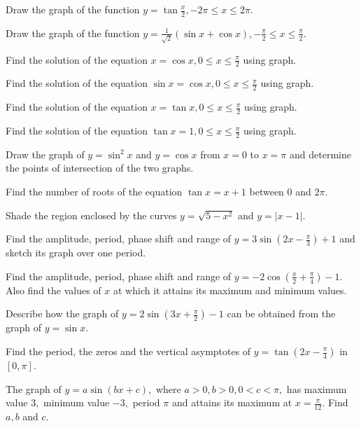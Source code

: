 \item Draw the graph of the function $y = \tan\frac{x}{2}, -2\pi\leq x\leq 2\pi$.

\item Draw the graph of the function $y = \frac{1}{\sqrt{2}}(\sin x + \cos x), -\frac{\pi}{2}\leq
    x\leq\frac{\pi}{2}$.

\item Find the solution of the equation $x = \cos x, 0\leq x\leq\frac{\pi}{2}$ using graph.

\item Find the solution of the equation $\sin x = \cos x, 0\leq x\leq\frac{\pi}{2}$ using graph.

\item Find the solution of the equation $x = \tan x, 0\leq x\leq\frac{\pi}{2}$ using graph.

\item Find the solution of the equation $\tan x = 1, 0\leq x\leq \frac{\pi}{2}$ using graph.

\item Draw the graph of $y = \sin^2x$ and $y = \cos x$ from $x = 0$ to $x = \pi$ and
    determine the points of intersection of the two graphs.

\item Find the number of roots of the equation $\tan x = x + 1$ between $0$ and $2\pi$.

\item Shade the region enclosed by the curves $y = \sqrt{5 - x^2}$ and $y = |x - 1|$.

\item Find the amplitude, period, phase shift and range of $y = 3\sin\left(2x - \frac{\pi}{3}\right) + 1$ and
    sketch its graph over one period.

\item Find the amplitude, period, phase shift and range of $y = -2\cos\left(\frac{x}{2} + \frac{\pi}{4}\right) - 1.$
    Also find the values of $x$ at which it attains its maximum and minimum values.

\item Describe how the graph of $y = 2\sin\left(3x + \frac{\pi}{2}\right) - 1$ can be obtained from the graph of
    $y = \sin x.$

\item Find the period, the zeros and the vertical asymptotes of $y = \tan\left(2x - \frac{\pi}{4}\right)$ in $[0, \pi].$

\item The graph of $y = a\sin(bx + c),$ where $a > 0, b > 0, 0 < c < \pi,$ has maximum value $3,$ minimum value $-3,$
    period $\pi$ and attains its maximum at $x = \frac{\pi}{12}.$ Find $a, b$ and $c.$

